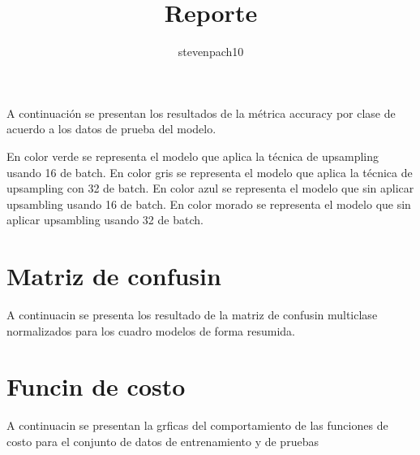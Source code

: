 \documentclass{article}
\title{Reporte}
\author{%
stevenpach10
}
\begin{document}
\maketitle

A continuación se presentan los resultados de la métrica accuracy por clase de acuerdo a los datos de prueba del modelo. 

En color verde se representa el modelo que aplica la técnica de upsampling usando 16 de batch. En color gris se representa el modelo que aplica la técnica de upsampling con 32 de batch. En color azul se representa el modelo que sin aplicar upsambling usando 16 de batch. En color morado se representa el modelo que sin aplicar upsambling usando 32 de batch.
\section{Matriz de confusin}

A continuacin se presenta los resultado de la matriz de confusin multiclase normalizados para los cuadro modelos de forma resumida.

\section{Funcin de costo}

A continuacin se presentan la grficas del comportamiento de las funciones de costo para el conjunto de datos de entrenamiento y de pruebas
\end{document}
